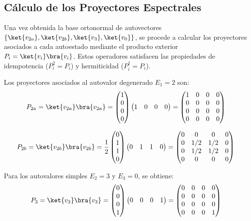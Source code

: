 \documentclass[11pt,a4paper,spanish]{book}
\begin{document}
\subsection{Cálculo de los Proyectores Espectrales}

Una vez obtenida la base ortonormal de autovectores $\{\ket{v_{2a}}, \ket{v_{2b}}, \ket{v_3}, \ket{v_0}\}$, se procede a calcular los proyectores asociados a cada autoestado mediante el producto exterior $P_i = \ket{v_i}\bra{v_i}$. Estos operadores satisfacen las propiedades de idempotencia ($P_i^2 = P_i$) y hermiticidad ($P_i^\dagger = P_i$)\citep{dirac1930}.

Los proyectores asociados al autovalor degenerado $E_1 = 2$ son:
\begin{equation}
P_{2a} = \ket{v_{2a}}\bra{v_{2a}} = 
\begin{pmatrix} 1 \\ 0 \\ 0 \\ 0 \end{pmatrix}
\begin{pmatrix} 1 & 0 & 0 & 0 \end{pmatrix} =
\begin{pmatrix} 
1 & 0 & 0 & 0 \\ 
0 & 0 & 0 & 0 \\ 
0 & 0 & 0 & 0 \\ 
0 & 0 & 0 & 0 
\end{pmatrix}
\end{equation}

\begin{equation}
P_{2b} = \ket{v_{2b}}\bra{v_{2b}} = \frac{1}{2}
\begin{pmatrix} 0 \\ 1 \\ 1 \\ 0 \end{pmatrix}
\begin{pmatrix} 0 & 1 & 1 & 0 \end{pmatrix} =
\begin{pmatrix} 
0 & 0 & 0 & 0 \\ 
0 & 1/2 & 1/2 & 0 \\ 
0 & 1/2 & 1/2 & 0 \\ 
0 & 0 & 0 & 0 
\end{pmatrix}
\end{equation}

Para los autovalores simples $E_2 = 3$ y $E_3 = 0$, se obtiene:
\begin{equation}
P_{3} = \ket{v_{3}}\bra{v_{3}} = 
\begin{pmatrix} 0 \\ 0 \\ 0 \\ 1 \end{pmatrix}
\begin{pmatrix} 0 & 0 & 0 & 1 \end{pmatrix} =
\begin{pmatrix} 
0 & 0 & 0 & 0 \\ 
0 & 0 & 0 & 0 \\ 
0 & 0 & 0 & 0 \\ 
0 & 0 & 0 & 1 
\end{pmatrix}
\end{equation}
\end{document}

